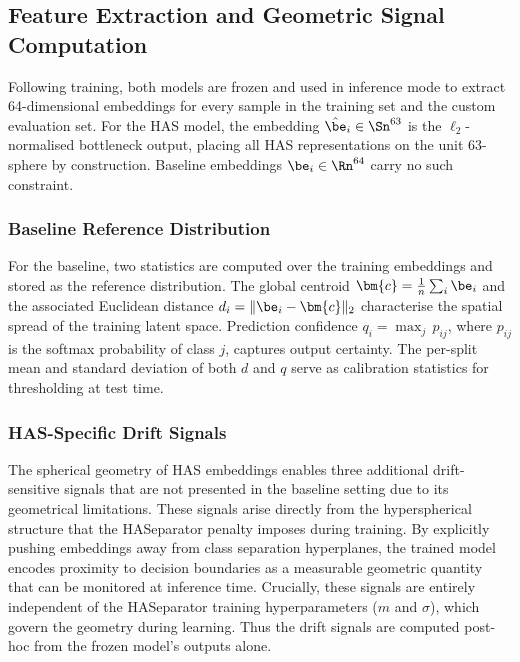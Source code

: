 \subsection{Feature Extraction and Geometric Signal Computation}
\label{sec:extraction}

Following training, both models are frozen and used in inference
mode to extract 64-dimensional embeddings for every sample in
the training set and the custom evaluation set.
For the HAS model, the embedding $\hat{\be}_i \in \Sn^{63}$ is
the $\ell_2$-normalised bottleneck output, placing all HAS
representations on the unit 63-sphere by construction.
Baseline embeddings $\be_i \in \Rn^{64}$ carry no such constraint.

\subsubsection{Baseline Reference Distribution}

For the baseline, two statistics are computed over the training
embeddings and stored as the reference distribution.
The global centroid $\bm{c} = \frac{1}{n}\sum_i \be_i$
and the associated Euclidean distance
$d_i = \|\be_i - \bm{c}\|_2$
characterise the spatial spread of the training latent space.
Prediction confidence $q_i = \max_j\, p_{ij}$, where
$p_{ij}$ is the softmax probability of class $j$, captures
output certainty.
The per-split mean and standard deviation of both $d$ and $q$
serve as calibration statistics for thresholding at test time.

\subsubsection{HAS-Specific Drift Signals}

The spherical geometry of HAS embeddings enables three additional
drift-sensitive signals that are not presented in the baseline setting due to its geometrical limitations. These signals arise directly from the hyperspherical structure that the
HASeparator penalty imposes during training. 
By explicitly pushing embeddings away from class separation hyperplanes, the trained
model encodes proximity to decision boundaries as a measurable
geometric quantity that can be monitored at inference time.
Crucially, these signals are entirely independent of the
HASeparator training hyperparameters ($m$ and $\sigma$), which
govern the geometry during learning.
Thus the drift signals are computed post-hoc from the frozen model's outputs alone.


